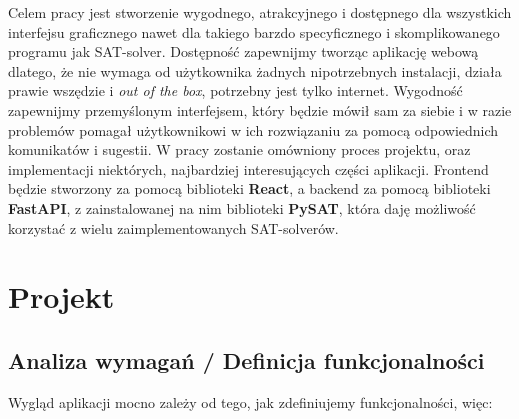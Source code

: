 \documentclass[a4paper,12pt,oneside]{book}
\theoremstyle{definition}
\begin{document}
Celem pracy jest stworzenie wygodnego, atrakcyjnego i dostępnego dla wszystkich interfejsu graficznego nawet dla takiego barzdo specyficznego i skomplikowanego programu jak SAT-solver. Dostępność zapewnijmy tworząc aplikację webową dlatego, że nie wymaga od użytkownika żadnych nipotrzebnych instalacji, działa prawie wszędzie i \textit{out of the box}, potrzebny jest tylko internet. Wygodność zapewnijmy przemyślonym interfejsem, który będzie mówił sam za siebie i w razie problemów pomagał użytkownikowi w ich rozwiązaniu za pomocą odpowiednich komunikatów i sugestii. W pracy zostanie omówniony proces projektu, oraz implementacji niektórych, najbardziej interesujących części aplikacji. Frontend będzie stworzony za pomocą biblioteki \textbf{React}, a backend za pomocą biblioteki \textbf{FastAPI}, z zainstalowanej na nim biblioteki \textbf{PySAT}, która daję możliwość korzystać z wielu zaimplementowanych SAT-solverów. 

\chapter{Projekt}

\section{Analiza wymagań / Definicja funkcjonalności}

Wygląd aplikacji mocno zależy od tego, jak zdefiniujemy funkcjonalności, więc:  
\end{document}
